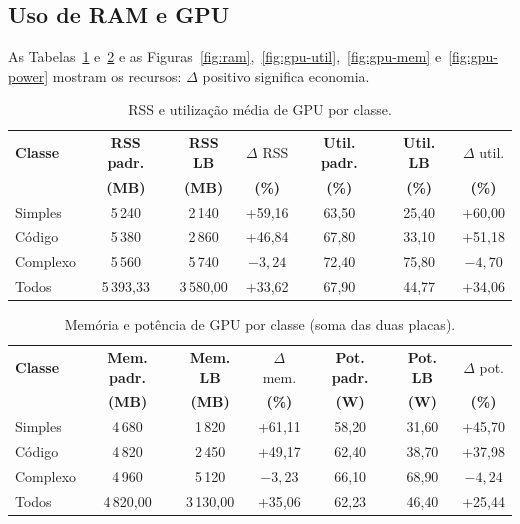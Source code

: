 \documentclass[12pt]{article}
\begin{document}
\subsection{Uso de RAM e GPU}

As Tabelas~\ref{tab:recursos_ram} e~\ref{tab:recursos_gpu} e as Figuras~\ref{fig:ram},~\ref{fig:gpu-util},~\ref{fig:gpu-mem} e~\ref{fig:gpu-power} mostram os recursos: $\Delta$ positivo significa economia.

\begin{table}[htb]
\centering
\small
\caption{RSS e utilização média de GPU por classe.}
\label{tab:recursos_ram}
\begin{tabular}{lcccccc}
\hline\hline
\textbf{Classe} & \textbf{RSS padr.} & \textbf{RSS LB} & $\Delta$ RSS & \textbf{Util. padr.} & \textbf{Util. LB} & $\Delta$ util. \\
 & \textbf{(MB)} & \textbf{(MB)} & \textbf{(\%)} & \textbf{(\%)} & \textbf{(\%)} & \textbf{(\%)} \\
\hline
Simples  & 5\,240   & 2\,140   & +59{,}16 & 63{,}50 & 25{,}40 & +60{,}00 \\
Código   & 5\,380   & 2\,860   & +46{,}84 & 67{,}80 & 33{,}10 & +51{,}18 \\
Complexo & 5\,560   & 5\,740   & $-3{,}24$ & 72{,}40 & 75{,}80 & $-4{,}70$ \\
Todos    & 5\,393{,}33 & 3\,580{,}00 & +33{,}62 & 67{,}90 & 44{,}77 & +34{,}06 \\
\hline\hline
\end{tabular}
\end{table}

\begin{table}[htb]
\centering
\small
\caption{Memória e potência de GPU por classe (soma das duas placas).}
\label{tab:recursos_gpu}
\begin{tabular}{lcccccc}
\hline\hline
\textbf{Classe} & \textbf{Mem. padr.} & \textbf{Mem. LB} & $\Delta$ mem. & \textbf{Pot. padr.} & \textbf{Pot. LB} & $\Delta$ pot. \\
 & \textbf{(MB)} & \textbf{(MB)} & \textbf{(\%)} & \textbf{(W)} & \textbf{(W)} & \textbf{(\%)} \\
\hline
Simples  & 4\,680   & 1\,820   & +61{,}11 & 58{,}20 & 31{,}60 & +45{,}70 \\
Código   & 4\,820   & 2\,450   & +49{,}17 & 62{,}40 & 38{,}70 & +37{,}98 \\
Complexo & 4\,960   & 5\,120   & $-3{,}23$ & 66{,}10 & 68{,}90 & $-4{,}24$ \\
Todos    & 4\,820{,}00 & 3\,130{,}00 & +35{,}06 & 62{,}23 & 46{,}40 & +25{,}44 \\
\hline\hline
\end{tabular}
\end{table}
\end{document}
